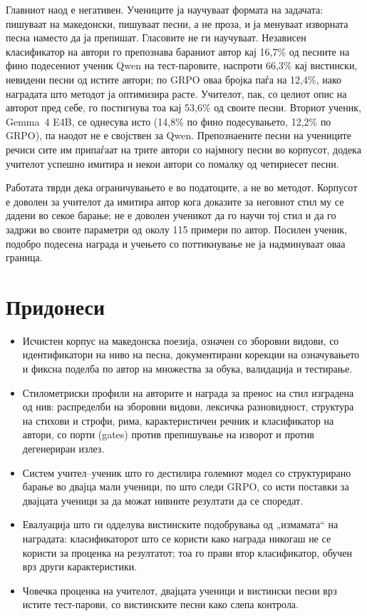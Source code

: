 Главниот наод е негативен. Учениците ја научуваат формата на задачата:
пишуваат на македонски, пишуваат песни, а не проза, и ја менуваат
изворната песна наместо да ја препишат. Гласовите не ги научуваат.
Независен класификатор на автори го препознава бараниот автор кај 16,7\%
од песните на фино подесениот ученик Qwen на тест-паровите, наспроти 66,3\% кај
вистински, невидени песни од истите автори; по GRPO оваа бројка паѓа на
12,4\%, иако наградата што методот ја оптимизира расте. Учителот, пак,
со целиот опис на авторот пред себе, го постигнува тоа кај 53,6\% од
своите песни. Вториот ученик, Gemma~4 E4B, се однесува исто (14,8\% по фино подесувањето, 12,2\% по GRPO), па наодот не е својствен за Qwen. 
Препознаените песни на учениците речиси сите им припаѓаат на трите
автори со најмногу песни во корпусот, додека учителот успешно имитира и
некои автори со помалку од четириесет песни.

Работата тврди дека ограничувањето е во податоците, а не во методот.
Корпусот е доволен за учителот да имитира автор кога доказите за неговиот
стил му се дадени во секое барање; не е доволен ученикот да го научи тој
стил и да го задржи во своите параметри од околу 115 примери по автор.
Посилен ученик, подобро подесена награда и учењето со поттикнување не ја
надминуваат оваа граница.

\section{Придонеси}

\begin{itemize}
  \item Исчистен корпус на македонска поезија, означен со зборовни
        видови, со идентификатори на ниво на песна, документирани
        корекции на означувањето и фиксна поделба по автор на
        множества за обука, валидација и тестирање.
  \item Стилометриски профили на авторите и награда за пренос на стил
        изградена од нив: распределби на зборовни видови, лексичка
        разновидност, структура на стихови и строфи, рима,
        карактеристичен речник и класификатор на автори, со порти
        (gates) против препишување на изворот и против дегенериран излез.
  \item Систем учител–ученик што го дестилира големиот модел со
        структурирано барање во двајца мали ученици, по што следи
        GRPO, со исти поставки за двајцата ученици за да можат нивните
        резултати да се споредат.
  \item Евалуација што ги одделува вистинските подобрувања од
        „измамата“ на наградата: класификаторот што се користи како
        награда никогаш не се користи за проценка на резултатот; тоа го
        прави втор класификатор, обучен врз други карактеристики.
  \item Човечка проценка на учителот, двајцата ученици и вистински
        песни врз истите тест-парови, со вистинските песни како слепа
        контрола.
\end{itemize}

